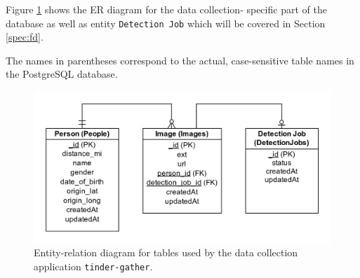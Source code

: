 Figure \ref{fig:spec:erd_basic} shows the ER diagram for the data collection-
specific part of the database as well as entity \texttt{Detection Job} which 
will be covered in Section \ref{spec:fd}.

The names in parentheses correspond to the actual, case-sensitive table names 
in the PostgreSQL database. 
\begin{figure}[t]
  \centering
  \includegraphics[width=\textwidth]{figures/spec/erd_basic}
  \caption{Entity-relation diagram for tables used by the data collection 
  application \texttt{tinder-gather}. }
  \label{fig:spec:erd_basic}
\end{figure}

